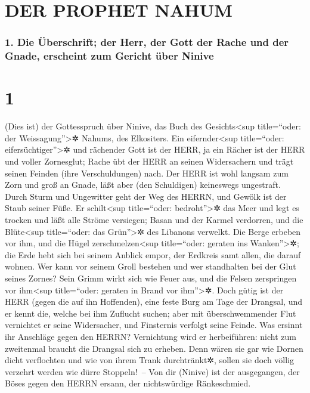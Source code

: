 \hypertarget{der-prophet-nahum}{%
\section{DER PROPHET NAHUM}\label{der-prophet-nahum}}

\hypertarget{die-uxfcberschrift-der-herr-der-gott-der-rache-und-der-gnade-erscheint-zum-gericht-uxfcber-ninive}{%
\subsubsection{1. Die Überschrift; der Herr, der Gott der Rache und der
Gnade, erscheint zum Gericht über
Ninive}\label{die-uxfcberschrift-der-herr-der-gott-der-rache-und-der-gnade-erscheint-zum-gericht-uxfcber-ninive}}

\hypertarget{section}{%
\section{1}\label{section}}

 (Dies ist) der Gottesspruch über Ninive, das Buch des
Gesichts\textless sup title=``oder: der Weissagung''\textgreater✲
Nahums, des Elkositers.  Ein eifernder\textless sup
title=``oder: eifersüchtiger''\textgreater✲ und rächender Gott ist der
HERR, ja ein Rächer ist der HERR und voller Zornesglut; Rache übt der
HERR an seinen Widersachern und trägt seinen Feinden (ihre
Verschuldungen) nach.  Der HERR ist wohl langsam zum Zorn
und groß an Gnade, läßt aber (den Schuldigen) keineswegs ungestraft.
Durch Sturm und Ungewitter geht der Weg des HERRN, und Gewölk ist der
Staub seiner Füße.  Er schilt\textless sup title=``oder:
bedroht''\textgreater✲ das Meer und legt es trocken und läßt alle Ströme
versiegen; Basan und der Karmel verdorren, und die Blüte\textless sup
title=``oder: das Grün''\textgreater✲ des Libanons verwelkt.
 Die Berge erbeben vor ihm, und die Hügel
zerschmelzen\textless sup title=``oder: geraten ins
Wanken''\textgreater✲; die Erde hebt sich bei seinem Anblick empor, der
Erdkreis samt allen, die darauf wohnen.  Wer kann vor
seinem Groll bestehen und wer standhalten bei der Glut seines Zornes?
Sein Grimm wirkt sich wie Feuer aus, und die Felsen zerspringen vor
ihm\textless sup title=``oder: geraten in Brand vor ihm''\textgreater✲.
 Doch gütig ist der HERR (gegen die auf ihn Hoffenden),
eine feste Burg am Tage der Drangsal, und er kennt die, welche bei ihm
Zuflucht suchen;  aber mit überschwemmender Flut
vernichtet er seine Widersacher, und Finsternis verfolgt seine Feinde.
 Was ersinnt ihr Anschläge gegen den HERRN? Vernichtung
wird er herbeiführen: nicht zum zweitenmal braucht die Drangsal sich zu
erheben.  Denn wären sie gar wie Dornen dicht verflochten
und wie von ihrem Trank durchtränkt✲, sollen sie doch völlig verzehrt
werden wie dürre Stoppeln!~--  Von dir (Ninive) ist der
ausgegangen, der Böses gegen den HERRN ersann, der nichtswürdige
Ränkeschmied.

